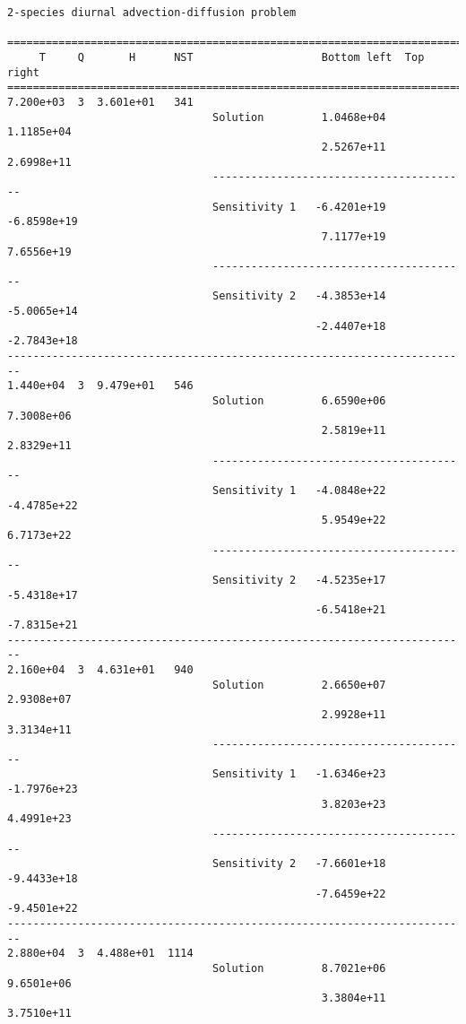 \begin{verbatim}
2-species diurnal advection-diffusion problem

========================================================================
     T     Q       H      NST                    Bottom left  Top right 
========================================================================
7.200e+03  3  3.601e+01   341
                                Solution         1.0468e+04   1.1185e+04 
                                                 2.5267e+11   2.6998e+11 
                                ----------------------------------------
                                Sensitivity 1   -6.4201e+19  -6.8598e+19 
                                                 7.1177e+19   7.6556e+19 
                                ----------------------------------------
                                Sensitivity 2   -4.3853e+14  -5.0065e+14 
                                                -2.4407e+18  -2.7843e+18 
------------------------------------------------------------------------
1.440e+04  3  9.479e+01   546
                                Solution         6.6590e+06   7.3008e+06 
                                                 2.5819e+11   2.8329e+11 
                                ----------------------------------------
                                Sensitivity 1   -4.0848e+22  -4.4785e+22 
                                                 5.9549e+22   6.7173e+22 
                                ----------------------------------------
                                Sensitivity 2   -4.5235e+17  -5.4318e+17 
                                                -6.5418e+21  -7.8315e+21 
------------------------------------------------------------------------
2.160e+04  3  4.631e+01   940
                                Solution         2.6650e+07   2.9308e+07 
                                                 2.9928e+11   3.3134e+11 
                                ----------------------------------------
                                Sensitivity 1   -1.6346e+23  -1.7976e+23 
                                                 3.8203e+23   4.4991e+23 
                                ----------------------------------------
                                Sensitivity 2   -7.6601e+18  -9.4433e+18 
                                                -7.6459e+22  -9.4501e+22 
------------------------------------------------------------------------
2.880e+04  3  4.488e+01  1114
                                Solution         8.7021e+06   9.6501e+06 
                                                 3.3804e+11   3.7510e+11 

\end{verbatim}
